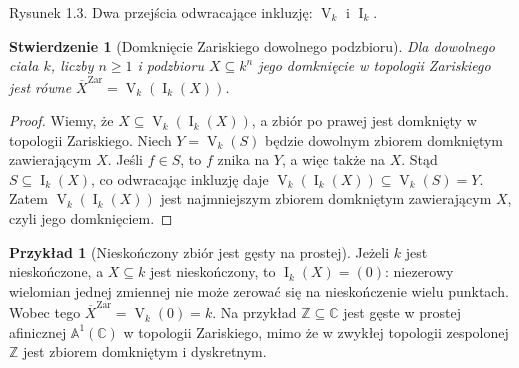 \documentclass[11pt,a4paper,openany]{report}
\numberwithin{equation}{section}
\theoremstyle{plain}
\newtheorem{stwierdzenie}[twierdzenie]{Stwierdzenie}
\theoremstyle{definition}
\newtheorem{przyklad}[twierdzenie]{Przykład}
\theoremstyle{remark}
\newcommand{\Z}{\mathbb Z}
\newcommand{\C}{\mathbb C}
\newcommand{\A}{\mathbb A}
\newcommand{\V}{\operatorname V}
\newcommand{\I}{\operatorname I}
\begin{document}
\begin{center}
\end{center}
\begin{center}\small Rysunek 1.3. Dwa przejścia odwracające inkluzję: $\V_k$ i $\I_k$.\end{center}

\begin{stwierdzenie}[Domknięcie Zariskiego dowolnego podzbioru]
\label{st:closure}
Dla dowolnego ciała $k$, liczby $n\ge1$ i podzbioru
$X\subseteq k^n$ jego domknięcie w topologii Zariskiego jest równe
$\overline X^{\mathrm{Zar}}=\V_k(\I_k(X))$.
\end{stwierdzenie}
\begin{proof}
Wiemy, że $X\subseteq\V_k(\I_k(X))$, a zbiór po prawej
jest domknięty w topologii Zariskiego.
Niech $Y=\V_k(S)$ będzie dowolnym zbiorem domkniętym zawierającym $X$.
Jeśli $f\in S$, to $f$ znika na $Y$, a więc także na $X$.
Stąd $S\subseteq\I_k(X)$, co odwracając inkluzję daje
$\V_k(\I_k(X))\subseteq\V_k(S)=Y$.
Zatem $\V_k(\I_k(X))$ jest najmniejszym zbiorem domkniętym
zawierającym $X$, czyli jego domknięciem.
\end{proof}

\begin{przyklad}[Nieskończony zbiór jest gęsty na prostej]
Jeżeli $k$ jest nieskończone, a $X\subseteq k$ jest nieskończony,
to $\I_k(X)=(0)$: niezerowy wielomian jednej zmiennej nie może
zerować się na nieskończenie wielu punktach.
Wobec tego $\overline X^{\mathrm{Zar}}=\V_k(0)=k$.
Na przykład $\Z\subseteq\C$ jest gęste w prostej afinicznej
$\A^1(\C)$ w topologii Zariskiego, mimo że w zwykłej topologii
zespolonej $\Z$ jest zbiorem domkniętym i dyskretnym.
\end{przyklad}
\end{document}
